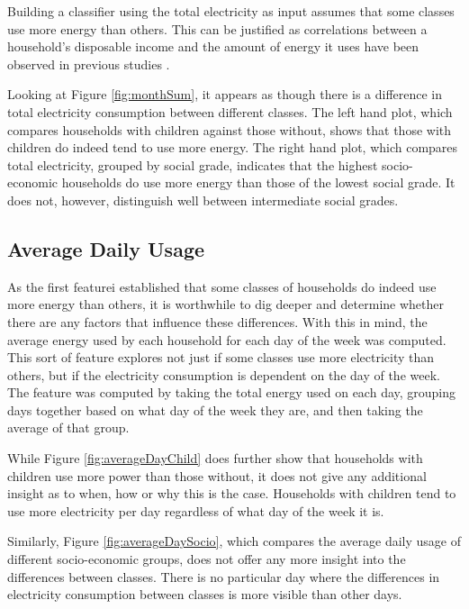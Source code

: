 Building a classifier using the total electricity as input assumes that some classes use more energy than others. This can be justified as correlations between a household's disposable income and the amount of energy it uses have been observed in previous studies \cite{Gomez}.

\monthSum %

Looking at Figure \ref{fig:monthSum}, it appears as though there is a difference in total electricity consumption between different classes. The left hand plot, which compares households with children against those without, shows that those with children do indeed tend to use more energy. The right hand plot, which compares total electricity, grouped by social grade, indicates that the highest socio-economic households do use more energy than those of the lowest social grade. It does not, however, distinguish well between intermediate social grades.

\subsection*{Average Daily Usage}
As the first featurei established that some classes of households do indeed use more energy than others, it is worthwhile to dig deeper and determine whether there are any factors that influence these differences. With this in mind, the average energy used by each household for each day of the week was computed. This sort of feature explores not just if some classes use more electricity than others, but if the electricity consumption is dependent on the day of the week. The feature was computed by taking the total energy used on each day, grouping days together based on what day of the week they are, and then taking the average of that group.

\averageDayChild %
\averageDaySocio %

While Figure \ref{fig:averageDayChild} does further show that households with children use more power than those without, it does not give any additional insight as to when, how or why this is the case. Households with children tend to use more electricity per day regardless of what day of the week it is.

Similarly, Figure \ref{fig:averageDaySocio}, which compares the average daily usage of different socio-economic groups, does not offer any more insight into the differences between classes. There is no particular day where the differences in electricity consumption between classes is more visible than other days.

